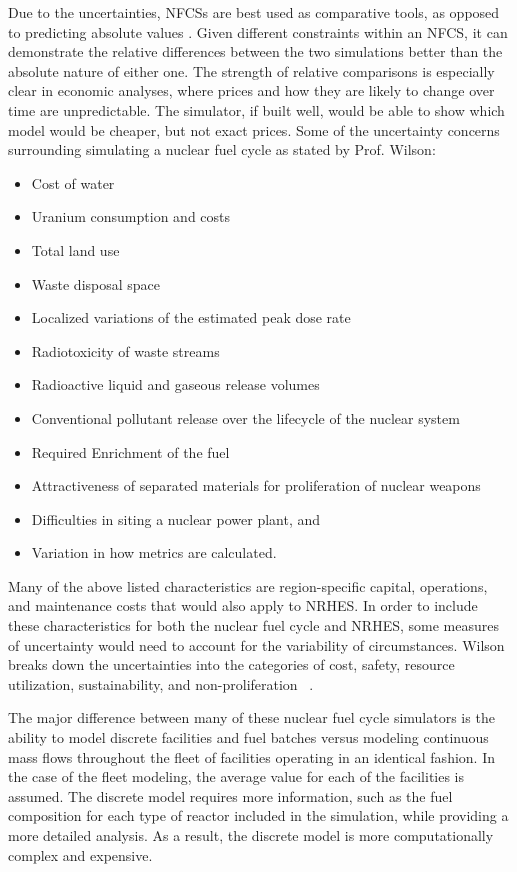 \documentclass[12pt]{UIdahoMastersThesis}
\begin{document}
Due to the uncertainties, NFCSs are best used as comparative tools, as opposed to predicting absolute values \cite{Wilson2012}. Given different constraints within an NFCS, it can demonstrate the relative differences between the two simulations better than the absolute nature of either one. The strength of relative comparisons is especially clear in economic analyses, where prices and how they are likely to change over time are unpredictable. The simulator, if built well, would be able to show which model would be cheaper, but not exact prices\cite{Wilson2012}. Some of the uncertainty concerns surrounding simulating a nuclear fuel cycle as stated by Prof. Wilson:

\begin{itemize}
\item Cost of water
\item Uranium consumption and costs
\item Total land use
\item Waste disposal space
\item Localized variations of the estimated peak dose rate
\item Radiotoxicity of waste streams
\item Radioactive liquid and gaseous release volumes
\item Conventional pollutant release over the lifecycle of the nuclear system
\item Required Enrichment of the fuel
\item Attractiveness of separated materials for proliferation of nuclear weapons
\item Difficulties in siting a nuclear power plant, and
\item Variation in how metrics are calculated.
\end{itemize}

Many of the above listed characteristics are region-specific capital, operations, and maintenance costs that would also apply to NRHES.  In order to include these characteristics for both the nuclear fuel cycle and NRHES, some measures of uncertainty would need to account for the variability of circumstances. Wilson breaks down the uncertainties into the categories of cost, safety, resource utilization, sustainability, and non-proliferation ~\cite {Wilson2012}. 

The major difference between many of these nuclear fuel cycle simulators is the ability to model discrete facilities and fuel batches versus modeling continuous mass flows throughout the fleet of facilities operating in an identical fashion. In the case of the fleet modeling, the average value for each of the facilities is assumed. The discrete model requires more information, such as the fuel composition for each type of reactor included in the simulation, while providing a more detailed analysis. As a result, the discrete model is more computationally complex and expensive.
\end{document}
